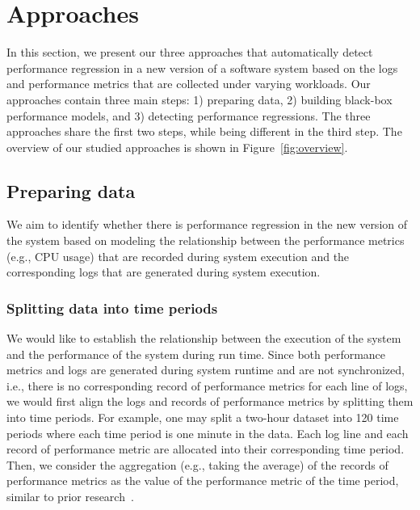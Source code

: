 \section{Approaches} \label{sec:approach}


In this section, we present our three approaches that automatically detect performance regression in a new version of a software system based on the logs and performance metrics that are collected under varying workloads. Our approaches contain three main steps: 1) preparing data, 2) building black-box performance models, and 3) detecting performance regressions. The three approaches share the first two steps, while being different in the third step. The overview of our studied approaches is shown in Figure~\ref{fig:overview}.

\subsection{Preparing data}
We aim to identify whether there is performance regression in the new version of the system based on modeling the relationship between the performance metrics (e.g., CPU usage) that are recorded during system execution and the corresponding logs that are generated during system execution.

\subsubsection{Splitting data into time periods}
We would like to establish the relationship between the execution of the system and the performance of the system during run time. Since both performance metrics and logs are generated during system runtime and are not synchronized, i.e., there is no corresponding record of performance metrics for each line of logs, we would first align the logs and records of performance metrics by splitting them into time periods. For example, one may split a  two-hour dataset into 120 time periods where each time period is one minute in the data. Each log line and each record of performance metric are allocated into their corresponding time period. Then, we consider the aggregation (e.g., taking the average) of the records of performance metrics as the value of the performance metric of the time period, similar to prior research~\citep{Foo:2010:MPR:1848650.1849222}. 

